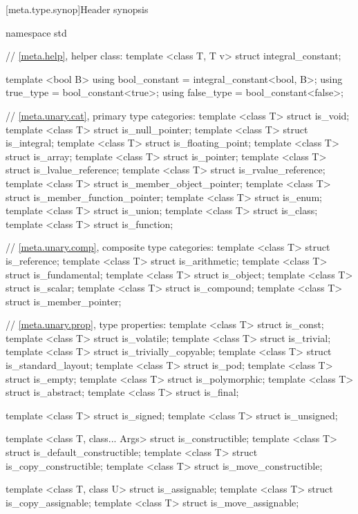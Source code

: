 %
[meta.type.synop]{Header  synopsis}
\begin{codeblock}
namespace std {
  // \ref{meta.help}, helper class:
  template <class T, T v> struct integral_constant;

  template <bool B>
    using bool_constant = integral_constant<bool, B>;
  using true_type  = bool_constant<true>;
  using false_type = bool_constant<false>;

  // \ref{meta.unary.cat}, primary type categories:
  template <class T> struct is_void;
  template <class T> struct is_null_pointer;
  template <class T> struct is_integral;
  template <class T> struct is_floating_point;
  template <class T> struct is_array;
  template <class T> struct is_pointer;
  template <class T> struct is_lvalue_reference;
  template <class T> struct is_rvalue_reference;
  template <class T> struct is_member_object_pointer;
  template <class T> struct is_member_function_pointer;
  template <class T> struct is_enum;
  template <class T> struct is_union;
  template <class T> struct is_class;
  template <class T> struct is_function;

  // \ref{meta.unary.comp}, composite type categories:
  template <class T> struct is_reference;
  template <class T> struct is_arithmetic;
  template <class T> struct is_fundamental;
  template <class T> struct is_object;
  template <class T> struct is_scalar;
  template <class T> struct is_compound;
  template <class T> struct is_member_pointer;

  // \ref{meta.unary.prop}, type properties:
  template <class T> struct is_const;
  template <class T> struct is_volatile;
  template <class T> struct is_trivial;
  template <class T> struct is_trivially_copyable;
  template <class T> struct is_standard_layout;
  template <class T> struct is_pod;
  template <class T> struct is_empty;
  template <class T> struct is_polymorphic;
  template <class T> struct is_abstract;
  template <class T> struct is_final;

  template <class T> struct is_signed;
  template <class T> struct is_unsigned;

  template <class T, class... Args> struct is_constructible;
  template <class T> struct is_default_constructible;
  template <class T> struct is_copy_constructible;
  template <class T> struct is_move_constructible;

  template <class T, class U> struct is_assignable;
  template <class T> struct is_copy_assignable;
  template <class T> struct is_move_assignable;

}
\end{codeblock}
